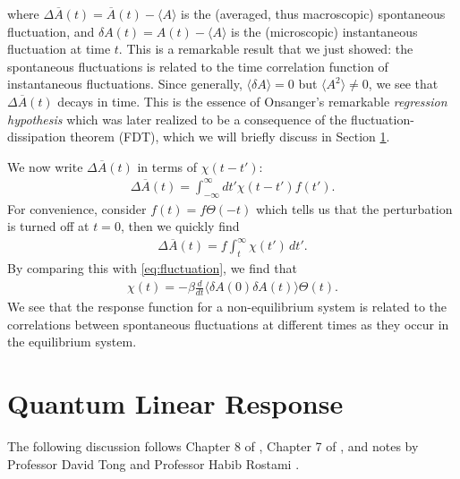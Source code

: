 \documentclass[reprint,
nofootinbib,
amsmath,amssymb,
aps]{revtex4-1}
\newcommand{\be}{\beta}
\newcommand{\f}[2]{\frac{#1}{#2}}
\begin{document}
where $\Delta \overline{A}(t) = \overline{A}(t) - \langle A \rangle$ is the (averaged, thus macroscopic) spontaneous fluctuation, and $\delta A(t) = A(t) - \langle A \rangle$ is the (microscopic) instantaneous fluctuation at time $t$. This is a remarkable result that we just showed: the spontaneous fluctuations is related to the time correlation function of instantaneous fluctuations. Since generally, $\langle \delta A \rangle = 0$ but $\langle A^2 \rangle \neq 0$, we see that $\Delta \overline{A}(t)$ decays in time. This is the essence of Onsanger's remarkable \textit{regression hypothesis} which was later realized to be a consequence of the fluctuation-dissipation theorem (FDT), which we will briefly discuss in Section \ref{sec:quantum}.

We now write $\Delta \overline{A}(t)$ in terms of $\chi(t-t')$:
\begin{align}
\label{eq:fluctuation_response_function}
\Delta \overline{A}(t) = \int_{-\infty}^\infty dt' \chi(t-t') f(t'). 
\end{align}
For convenience, consider $f(t) = f \Theta(-t)$ which tells us that the perturbation is turned off at $t=0$, then we quickly find
\begin{align*}
\Delta \overline{A}(t) = f \int_{t}^\infty \chi(t') \,dt'.
\end{align*}
By comparing this with \eqref{eq:fluctuation}, we find that
\begin{align*}
\chi(t) = -\be \f{d}{dt} \langle \delta A(0) \delta A(t) \rangle \Theta(t).
\end{align*}
We see that the response function for a non-equilibrium system is related to the correlations between spontaneous fluctuations at different times as they occur in the equilibrium system.


%
\section{Quantum Linear Response}\label{sec:quantum}

The following discussion follows Chapter 8 of \cite{chandler1988introduction}, Chapter 7 of \cite{chaikin1995principles}, and notes by Professor David Tong \cite{tong2012kinetic} and Professor Habib Rostami \cite{rostamilecture}.
\end{document}
